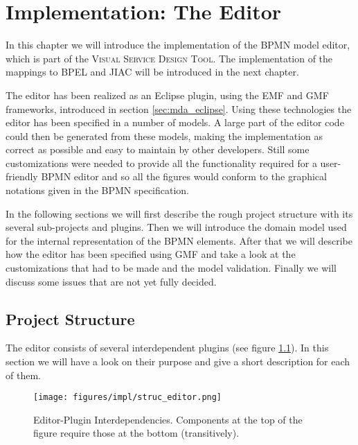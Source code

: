 \chapter{Implementation: The Editor}
\label{chapter:impl_editor}

In this chapter we will introduce the implementation of the BPMN model editor, which is part of the \textsc{Visual Service Design Tool}. The implementation of the mappings to BPEL and JIAC will be introduced in the next chapter.

The editor has been realized as an Eclipse plugin, using the EMF and GMF frameworks, introduced in section \ref{sec:mda_eclipse}. Using these technologies the editor has been specified in a number of models. A large part of the editor code could then be generated from these models, making the implementation as correct as possible and easy to maintain by other developers. Still some customizations were needed to provide all the functionality required for a user-friendly BPMN editor and so all the figures would conform to the graphical notations given in the BPMN specification.

In the following sections we will first describe the rough project structure with its several sub-projects and plugins. Then we will introduce the domain model used for the internal representation of the BPMN elements. After that we will describe how the editor has been specified using GMF and take a look at the customizations that had to be made and the model validation. Finally we will discuss some issues that are not yet fully decided.



\section{Project Structure}

The editor consists of several interdependent plugins (see figure \ref{fig:impl_struc_editor}). In this section we will have a look on their purpose and give a short description for each of them.

\begin{figure}[htp]
	\centering
	\texttt{[image: figures/impl/struc\_editor.png]}
	\caption[Editor-Plugin Interdependencies]{Editor-Plugin Interdependencies. Components at the top of the figure require those at the bottom (transitively).}
	\label{fig:impl_struc_editor}
\end{figure}

